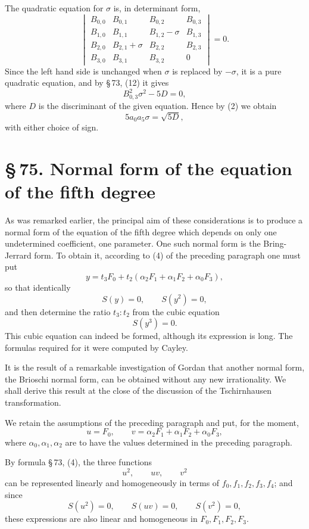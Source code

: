 \documentclass[11pt]{article}
\providecommand{\sect}[2]{\section*{\S\,#1. #2}}
\begin{document}
The quadratic equation for $\sigma$ is, in determinant form,
\[
\begin{vmatrix}
 B_{0,0}&B_{0,1}&B_{0,2}&B_{0,3}\\
 B_{1,0}&B_{1,1}&B_{1,2}-\sigma&B_{1,3}\\
 B_{2,0}&B_{2,1}+\sigma&B_{2,2}&B_{2,3}\\
 B_{3,0}&B_{3,1}&B_{3,2}&0
\end{vmatrix}=0.
\]
Since the left hand side is unchanged when $\sigma$ is replaced by $-\sigma$, it is a pure quadratic equation, and by \S\,73, (12) it gives
\[
 B_{0,3}^2\sigma^2-5D=0,
\]
where $D$ is the discriminant of the given equation. Hence by (2) we obtain
\begin{equation}
 5a_0a_5\sigma=\sqrt{5D},
\tag{12}
\end{equation}
with either choice of sign.

\sect{75}{Normal form of the equation of the fifth degree}

As was remarked earlier, the principal aim of these considerations is to produce a normal form of the equation of the fifth degree which depends on only one undetermined coefficient, one parameter. One such normal form is the Bring-Jerrard form. To obtain it, according to (4) of the preceding paragraph one must put
\begin{equation}
 y=t_3F_0+t_2(\alpha_2F_1+\alpha_1F_2+\alpha_0F_3),
\tag{1}
\end{equation}
so that identically
\[
 S(y)=0,
 \qquad S(y^2)=0,
\]
and then determine the ratio $t_3:t_2$ from the cubic equation
\[
 S(y^3)=0.
\]
This cubic equation can indeed be formed, although its expression is long. The formulas required for it were computed by Cayley.

It is the result of a remarkable investigation of Gordan that another normal form, the Brioschi normal form, can be obtained without any new irrationality. We shall derive this result at the close of the discussion of the Tschirnhausen transformation.

We retain the assumptions of the preceding paragraph and put, for the moment,
\begin{equation}
 u=F_0,
 \qquad
 v=\alpha_2F_1+\alpha_1F_2+\alpha_0F_3,
\tag{2}
\end{equation}
where $\alpha_0,\alpha_1,\alpha_2$ are to have the values determined in the preceding paragraph.

By formula \S\,73, (4), the three functions
\[
 u^2,
 \qquad uv,
 \qquad v^2
\]
can be represented linearly and homogeneously in terms of $f_0,f_1,f_2,f_3,f_4$; and since
\begin{equation}
 S(u^2)=0,
 \qquad S(uv)=0,
 \qquad S(v^2)=0,
\tag{3}
\end{equation}
these expressions are also linear and homogeneous in $F_0,F_1,F_2,F_3$.
\end{document}

